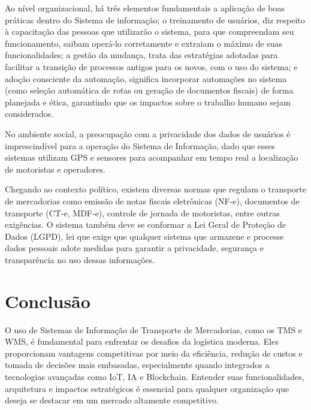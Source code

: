 \documentclass[conference]{IEEEtran}
\begin{document}
Ao nível organizacional, há três elementos fundamentais a aplicação de boas práticas dentro do Sistema de informação; o treinamento de usuários, diz respeito à capacitação das pessoas que utilizarão o sistema, para que compreendam seu funcionamento, saibam operá-lo corretamente e extraiam o máximo de suas funcionalidades; a gestão da mudança, trata das estratégias adotadas para facilitar a transição de processos antigos para os novos, com o uso do sistema; e adoção consciente da automação, significa incorporar automações no sistema (como seleção automática de rotas ou geração de documentos fiscais) de forma planejada e ética, garantindo que os impactos sobre o trabalho humano sejam considerados.

No ambiente social, a preocupação com a privacidade dos dados de usuários é imprescindível para a operação do Sistema de Informação, dado que esses sistemas utilizam GPS e sensores para acompanhar em tempo real a localização de motoristas e operadores.

Chegando ao contexto político, existem diversas normas que regulam o transporte de mercadorias como emissão de notas fiscais eletrônicas (NF-e), documentos de transporte (CT-e, MDF-e), controle de jornada de motoristas, entre outras exigências. O sistema também deve se conformar a Lei Geral de Proteção de Dados (LGPD), lei que exige que qualquer sistema que armazene e processe dados pessoais adote medidas para garantir a privacidade, segurança e transparência no uso dessas informações.
\section{Conclusão}
O uso de Sistemas de Informação de Transporte de Mercadorias, como os TMS e WMS, é fundamental para enfrentar os desafios da logística moderna. Eles proporcionam vantagens competitivas por meio da eficiência, redução de custos e tomada de decisões mais embasadas, especialmente quando integrados a tecnologias avançadas como IoT, IA e Blockchain. Entender suas funcionalidades, arquitetura e impactos estratégicos é essencial para qualquer organização que deseja se destacar em um mercado altamente competitivo.
\nocite{*}


\end{document}
